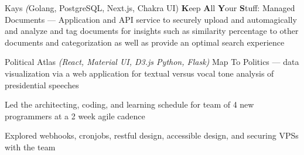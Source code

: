 

\begin{cventries}


\cventryproject
    {Kays} %
    {\emph(Golang, PostgreSQL, Next.js, Chakra UI)}
    {} %
    {\textbf{K}eep \textbf{A}ll \textbf{Y}our \textbf{S}tuff: Managed Documents --- Application and API service to securely upload and automagically and analyze and tag documents for insights such as similarity percentage to other documents and categorization as well as provide an optimal search experience} %
    {}

\cventryproject
    {Political Atlas} %
    {\emph{(React, Material UI, D3.js Python, Flask)}}
    {} %
    {Map To Politics --- data visualization via a web application for textual versus vocal tone analysis of presidential speeches} %
    {
      \begin{cvitems} %
        \item {Led the architecting, coding, and learning schedule for team of 4 new programmers at a 2 week agile cadence}
        \item {Explored webhooks, cronjobs, restful design, accessible design, and securing VPSs with the team}
      \end{cvitems}
    }

\end{cventries}
